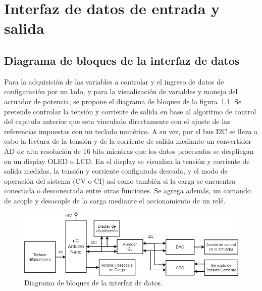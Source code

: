 \chapter{Interfaz de datos de entrada y salida}

\label{C:Interfaz de datos de entrada y salida}

\section{Diagrama de bloques de la interfaz de datos}
Para la adquisición de las variables a controlar y el ingreso de datos de configuración por un lado, y para la visualización de variables y manejo del actuador de potencia, se propone el diagrama de bloques de la figura~\ref{F:diagrama_digital}. Se pretende controlar la tensión y corriente de salida en base al algoritmo de control del capitulo anterior que esta vinculado directamente con el ajuste de las referencias impuestas con un teclado numérico. A su vez, por el bus I2C se lleva a cabo la lectura de la tensión y de la corriente de salida mediante un convertidor AD de alta resolución de 16 bits mientras que los datos procesados se despliegan en un display OLED o LCD. En el display se visualiza la tensión y corriente de salida medidas, la tensión y corriente configurada deseada, y el modo de operación del sistema (CV o CI) así como también si la carga se encuentra conectada o desconectada entre otras funciones. Se agrega además, un comando de acople y desacople de la carga mediante el accionamiento de un relé.

\begin{figure} [H]
    \centering
    \includegraphics[scale=0.5]{./imagenes/diagrama_digital.jpg}
    \caption{Diagrama de bloques de la interfaz de datos.}
    \label{F:diagrama_digital}
\end{figure}


